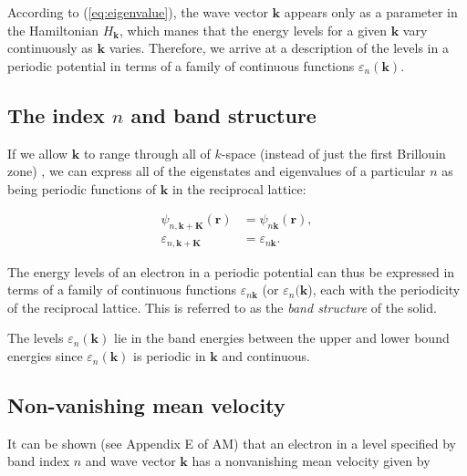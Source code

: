 		According to (\ref{eq:eigenvalue}), the wave vector $\mathbf{k}$ appears only as a parameter in the Hamiltonian $H_{\mathbf{k}}$, which manes that the energy levels for a given $\mathbf{k}$ vary continuously as $\mathbf{k}$ varies. Therefore, we arrive at a description of the levels in a periodic potential in terms of a family of continuous functions $\varepsilon_{n} (\mathbf{k})$. 

	\subsection{The index $n$ and band structure}
		If we allow $\mathbf{k}$ to range through all of $k$-space (instead of just the first Brillouin zone) , we can express all of the eigenstates and eigenvalues of a particular $n$ as being periodic functions of $\mathbf{k}$ in the reciprocal lattice:

		\begin{align} \label{eq:eigen_k_K}
			\psi_{n,\mathbf{k+K}} (\mathbf{r})
			&= \psi_{n\mathbf{k}} (\mathbf{r}), \\ \nonumber
			\varepsilon_{n, \mathbf{k+K}}
			&= \varepsilon_{n\mathbf{k}}.
		\end{align}


		The energy levels of an electron in a periodic potential can thus be expressed in terms of a family of continuous functions $\varepsilon_{n\mathbf{k}}$ (or $\varepsilon_{n}(\mathbf{k}$), each with the periodicity of the reciprocal lattice. This is referred to as the \emph{band structure} of the solid. 


		The levels $\varepsilon_n(\mathbf{k})$ lie in the band energies between the upper and lower bound energies since $\varepsilon_n(\mathbf{k})$ is periodic in $\mathbf{k}$ and continuous.

	\subsection{Non-vanishing mean velocity}
		It can be shown (see Appendix E of AM)  that an electron in a level specified by band index $n$ and wave vector $\mathbf{k}$ has a nonvanishing mean velocity given by

